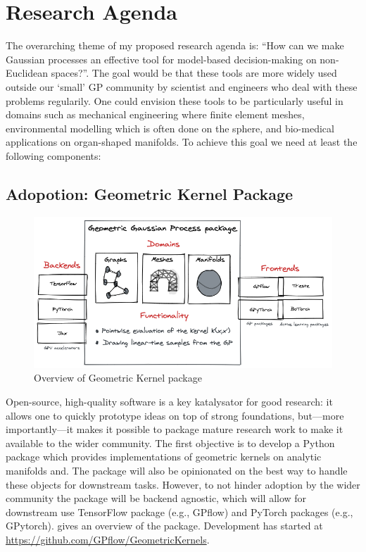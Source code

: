 \section{Research Agenda}
The overarching theme of my proposed research agenda is: ``How can we make Gaussian processes an effective tool for model-based decision-making on non-Euclidean spaces?''. The goal would be that these tools are more widely used outside our `small' GP community by scientist and engineers who deal with these problems regularily. One could envision these tools to be particularly useful in domains such as mechanical engineering where finite element meshes, environmental modelling which is often done on the sphere, and bio-medical applications on organ-shaped manifolds. To achieve this goal we need at least the following components:

\subsection{Adopotion: Geometric Kernel Package}

\begin{figure}
    \centering
    \includegraphics[width=.7\textwidth]{geomgp}
    \caption{Overview of Geometric Kernel package}
    \label{fig:geomgp}
\end{figure}

Open-source, high-quality software is a key katalysator for good research: it allows one to quickly prototype ideas on top of strong foundations, but---more importantly---it makes it possible to package mature research work to make it available to the wider community. The first objective is to develop a Python package which provides implementations of geometric kernels on analytic manifolds and. The package will also be opinionated on the best way to handle these objects for downstream tasks. However, to not hinder adoption by the wider community the package will be backend agnostic, which will allow for downstream use TensorFlow package (e.g., GPflow) and PyTorch packages (e.g., GPytorch).  gives an overview of the package. Development has started at \url{https://github.com/GPflow/GeometricKernels}.


